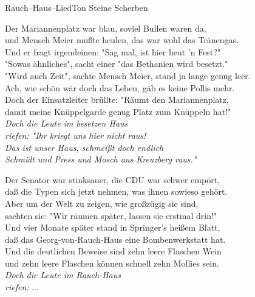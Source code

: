 
\begin{lied}{Rauch--Haus--Lied}{Ton Steine Scherben}

Der Mariannenplatz war blau, soviel Bullen waren da,\\
und Mensch Meier mußte heulen, das war wohl das Tränengas.\\
Und er fragt irgendeinen: "Sag mal, ist hier heut 'n Fest?"\\
"Sowas ähnliches", sacht einer "das Bethanien wird besetzt."\\
"Wird auch Zeit", sachte Mensch Meier, stand ja lange genug leer.\\
Ach, wie schön wär doch das Leben, gäb es keine Pollis mehr.\\
Doch der Einsatzleiter brüllte: "Räumt den Mariannenplatz,\\
damit meine Knüppelgarde genug Platz zum Knüppeln hat!"\\

\textit{Doch die Leute im besetzen Haus\\
riefen: "Ihr kriegt uns hier nicht raus!\\
Das ist unser Haus, schmeißt doch endlich\\
Schmidt und Press und Mosch aus Kreuzberg raus."\\}

Der Senator war stinksauer, die CDU war schwer empört,\\
daß die Typen sich jetzt nehmen, was ihnen sowieso gehört.\\
Aber um der Welt zu zeigen, wie großzügig sie sind,\\
sachten sie: "Wir räumen später, lassen sie erstmal drin!"\\
Und vier Monate später stand in Springer's heißem Blatt,\\
daß das Georg-von-Rauch-Haus eine Bombenwerkstatt hat.\\
Und die deutlichen Beweise sind zehn leere Flaschen Wein\\
und zehn leere Flaschen können schnell zehn Mollies sein.\\

\textit{Doch die Leute im Rauch-Haus\\
riefen:} ...\\


\end{lied}
